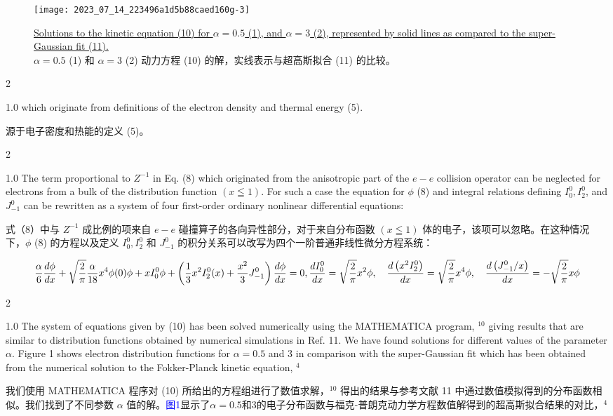 \documentclass[oneside,onecolumn]{article}
\newcommand\enzhbox[2]{
  	\quad\par \begin{paracol}{2} \colseprulecolor{black} 
  			\begin{spacing}{1.0}
  				\footnotesize  #1
  			\end{spacing}
  		\switchcolumn[1] 
  		#2
  	\end{paracol} 
  }
\begin{document}
\begin{sloppypar}
  \begin{figure}[tbp]
  	\centering
  	\texttt{[image: 2023\_07\_14\_223496a1d5b88caed160g-3]}
  	\caption{\uline{Solutions to the kinetic equation (10) for $\alpha=0.5$ (1), and $\alpha=3$ (2), represented by solid lines as compared to the super-Gaussian fit (11).}\\$\alpha=0.5$ (1) 和 $\alpha=3$ (2) 动力方程 (10) 的解，实线表示与超高斯拟合 (11) 的比较。}
  	\label{fig1.}
  \end{figure}
  
 
\enzhbox{   which originate from definitions of the electron density and thermal energy (5).
}{
源于电子密度和热能的定义 (5)。

}
  
 
\enzhbox{   The term proportional to $Z^{-1}$ in Eq. (8) which originated from the anisotropic part of the $e-e$ collision operator can be neglected for electrons from a bulk of the distribution function $(x \leqq 1)$. For such a case the equation for $\phi$ (8) and integral relations defining $I_{0}^{0}, I_{2}^{0}$, and $J_{-1}^{0}$ can be rewritten as a system of four first-order ordinary nonlinear differential equations:
}{
式（8）中与 $Z^{-1}$ 成比例的项来自 $e-e$ 碰撞算子的各向异性部分，对于来自分布函数 $(x \leqq 1)$ 体的电子，该项可以忽略。在这种情况下，$\phi$ (8) 的方程以及定义 $I_{0}^{0}, I_{2}^{0}$ 和 $J_{-1}^{0}$ 的积分关系可以改写为四个一阶普通非线性微分方程系统：

}
  
  
  
  \begin{dmath}[compact]
 	\frac{\alpha}{6} \frac{d \phi}{d x}+\sqrt{\frac{2}{\pi}} \frac{\alpha}{18} x^{4} \phi(0) \phi+x I_{0}^{0} \phi
  +\left(\frac{1}{3} x^{2} I_{2}^{0}(x)+\frac{x^{2}}{3} J_{-1}^{0}\right) \frac{d \phi}{d x}=0,\\
  \frac{d I_{0}^{0}}{d x}=\sqrt{\frac{2}{\pi}} x^{2} \phi , \quad \frac{d\left(x^{2} I_{2}^{0}\right)}{d x}=\sqrt{\frac{2}{\pi}} x^{4} \phi , \quad
  \frac{d\left(J_{-1}^{0} / x\right)}{d x}=-\sqrt{\frac{2}{\pi}} x \phi
 \end{dmath}
  
  
 
\enzhbox{   The system of equations given by (10) has been solved numerically using the MATHEMATICA program, ${ }^{10}$ giving results that are similar to distribution functions obtained by numerical simulations in Ref. 11. We have found solutions for different values of the parameter $\alpha$. Figure 1 shows electron distribution functions for $\alpha=0.5$ and 3 in comparison with the super-Gaussian fit which has been obtained from the numerical solution to the Fokker-Planck kinetic equation, ${ }^{4}$
}{
我们使用 MATHEMATICA 程序对 (10) 所给出的方程组进行了数值求解，${ }^{10}$ 得出的结果与参考文献 11 中通过数值模拟得到的分布函数相似。我们找到了不同参数 $\alpha$ 值的解。\textcolor{blue}{图1}显示了$\alpha=0.5$和3的电子分布函数与福克-普朗克动力学方程数值解得到的超高斯拟合结果的对比，${ }^{4}$

}
\end{sloppypar}
\end{document}
